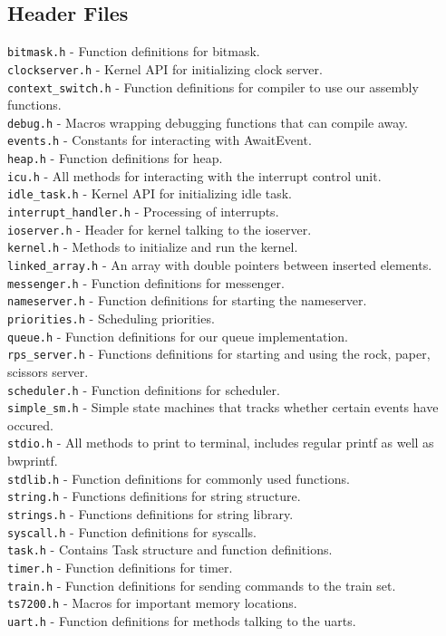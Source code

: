 \documentclass[letterpaper]{article}
\begin{document}
\subsection{Header Files}
\verb!bitmask.h! - Function definitions for bitmask.\\
\verb!clockserver.h! - Kernel API for initializing clock server.\\
\verb!context_switch.h! - Function definitions for compiler to use our assembly functions.\\
\verb!debug.h! - Macros wrapping debugging functions that can compile away.\\
\verb!events.h! - Constants for interacting with AwaitEvent.\\
\verb!heap.h! - Function definitions for heap.\\
\verb!icu.h! - All methods for interacting with the interrupt control unit.\\
\verb!idle_task.h! - Kernel API for initializing idle task.\\
\verb!interrupt_handler.h! - Processing of interrupts.\\
\verb!ioserver.h! - Header for kernel talking to the ioserver.\\
\verb!kernel.h! - Methods to initialize and run the kernel.\\
\verb!linked_array.h! - An array with double pointers between inserted elements.\\
\verb!messenger.h! - Function definitions for messenger.\\
\verb!nameserver.h! - Function definitions for starting the nameserver.\\
\verb!priorities.h! - Scheduling priorities.\\
\verb!queue.h! - Function definitions for our queue implementation.\\
\verb!rps_server.h! - Functions definitions for starting and using the rock, paper, scissors server. \\
\verb!scheduler.h! - Function definitions for scheduler.\\
\verb!simple_sm.h! - Simple state machines that tracks whether certain events have occured.\\
\verb!stdio.h! - All methods to print to terminal, includes regular printf as well as bwprintf.\\
\verb!stdlib.h! - Function definitions for commonly used functions.\\
\verb!string.h! - Functions definitions for string structure.\\
\verb!strings.h! - Functions definitions for string library.\\
\verb!syscall.h! - Function definitions for syscalls.\\
\verb!task.h! - Contains Task structure and function definitions.\\
\verb!timer.h! - Function definitions for timer.\\
\verb!train.h! - Function definitions for sending commands to the train set.\\
\verb!ts7200.h! - Macros for important memory locations.\\
\verb!uart.h! - Function definitions for methods talking to the uarts.\\
\end{document}
